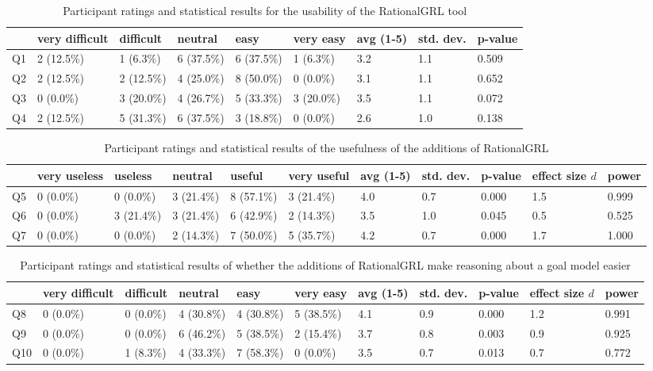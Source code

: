 \begin{table*}[t]
\centering
\begin{tabularx}{0.8\textwidth}{l|l|l|l|l|l||l|l|l}
& very difficult & difficult & neutral & easy & very easy & avg (1-5) & std. dev. & p-value \\
\hline
Q1 & 2 (12.5\%) & 1 (6.3\%)  & 6 (37.5\%) & 6 (37.5\%) & 1 (6.3\%)  & 3.2 & 1.1 & 0.509 \\
Q2 & 2 (12.5\%) & 2 (12.5\%) & 4 (25.0\%) & 8 (50.0\%) & 0 (0.0\%)  & 3.1 & 1.1 & 0.652 \\
Q3 & 0 (0.0\%)  & 3 (20.0\%) & 4 (26.7\%) & 5 (33.3\%) & 3 (20.0\%) & 3.5 & 1.1 & 0.072 \\
Q4 & 2 (12.5\%) & 5 (31.3\%) & 6 (37.5\%) & 3 (18.8\%) & 0 (0.0\%)  & 2.6 & 1.0 & 0.138 
\end{tabularx}
\caption{Participant ratings and statistical results for the usability of the RationalGRL tool}
\label{table:survey:table1}
\end{table*}

\begin{table*}[t]
\centering
\begin{tabularx}{0.95\textwidth}{l|l|l|l|l|l||l|l|l|l|l}
& very useless & useless & neutral & useful & very useful & avg (1-5) & std. dev. & p-value & effect size $d$ & power\\
\hline
Q5 & 0 (0.0\%) & 0 (0.0\%)  & 3 (21.4\%) & 8 (57.1\%) & 3 (21.4\%) & 4.0 & 0.7 & 0.000 & 1.5 & 0.999 \\
Q6 & 0 (0.0\%) & 3 (21.4\%) & 3 (21.4\%) & 6 (42.9\%) & 2 (14.3\%) & 3.5 & 1.0 & 0.045 & 0.5 & 0.525 \\
Q7 & 0 (0.0\%) & 0 (0.0\%)  & 2 (14.3\%) & 7 (50.0\%) & 5 (35.7\%) & 4.2 & 0.7 & 0.000 & 1.7 & 1.000
\end{tabularx}
\caption{Participant ratings and statistical results of the usefulness of the additions of RationalGRL}
\label{table:survey:table2}
\end{table*}

\begin{table*}[t]
\centering
\begin{tabularx}{0.95\textwidth}{l|l|l|l|l|l||l|l|l|l|l}
& very difficult & difficult & neutral & easy & very easy & avg (1-5) & std. dev. & p-value & effect size $d$ & power \\
\hline
Q8  & 0 (0.0\%) & 0 (0.0\%) & 4 (30.8\%) & 4 (30.8\%) & 5 (38.5\%) & 4.1 & 0.9 & 0.000 & 1.2 & 0.991\\
Q9  & 0 (0.0\%) & 0 (0.0\%) & 6 (46.2\%) & 5 (38.5\%) & 2 (15.4\%) & 3.7 & 0.8 & 0.003 & 0.9 & 0.925\\
Q10 & 0 (0.0\%) & 1 (8.3\%) & 4 (33.3\%) & 7 (58.3\%) & 0 (0.0\%)  & 3.5 & 0.7 & 0.013 & 0.7 & 0.772
\end{tabularx}
\caption{Participant ratings and statistical results of whether the additions of RationalGRL make reasoning about a goal model easier}
\label{table:survey:table3}
\end{table*}

